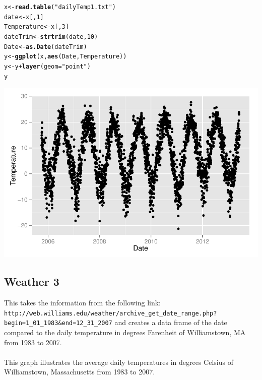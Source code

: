 \documentclass{article}\usepackage{graphicx, color}
\makeatletter
\def\maxwidth{ %
  \ifdim\Gin@nat@width>\linewidth
    \linewidth
  \else
    \Gin@nat@width
  \fi
}
\newcommand{\hlfunctioncall}[1]{\textcolor[rgb]{0.501960784313725,0,0.329411764705882}{\textbf{#1}}}%
\newcommand{\hlstring}[1]{\textcolor[rgb]{0.6,0.6,1}{#1}}%
\newenvironment{kframe}{%
 \def\at@end@of@kframe{}%
 \ifinner\ifhmode%
  \def\at@end@of@kframe{\end{minipage}}%
  \begin{minipage}{\columnwidth}%
 \fi\fi%
 \def\FrameCommand##1{\hskip\@totalleftmargin \hskip-\fboxsep
 \colorbox{shadecolor}{##1}\hskip-\fboxsep
     \hskip-\linewidth \hskip-\@totalleftmargin \hskip\columnwidth}%
 \MakeFramed {\advance\hsize-\width
   \@totalleftmargin\z@ \linewidth\hsize
   \@setminipage}}%
 {\par\unskip\endMakeFramed%
 \at@end@of@kframe}
\newenvironment{knitrout}{}{} %
\makeatother
\begin{document}
\begin{knitrout}
\color{fgcolor}\begin{kframe}
\begin{alltt}
x <- \hlfunctioncall{read.table}(\hlstring{"dailyTemp1.txt"})
date <- x[, 1]
Temperature <- x[, 3]
dateTrim <- \hlfunctioncall{strtrim}(date, 10)
Date <- \hlfunctioncall{as.Date}(dateTrim)
y <- \hlfunctioncall{ggplot}(x, \hlfunctioncall{aes}(Date, Temperature))
y <- y + \hlfunctioncall{layer}(geom = \hlstring{"point"})
y
\end{alltt}
\end{kframe}
\includegraphics[width=\maxwidth]{figure/graph2} 

\end{knitrout}


\subsection*{Weather 3}
This takes the information from the following link:
 \verb+http://web.williams.edu/weather/archive_get_date_range.php?begin=1_01_1983&end=12_31_2007+
and creates a data frame of the date compared to the daily temperature
in degrees Farenheit of Williamstown, MA from 1983 to 2007.
\\
\\
This graph illustrates the average daily temperatures in degrees Celsius of
Williamstown, Massachusetts from 1983 to 2007.
\end{document}
